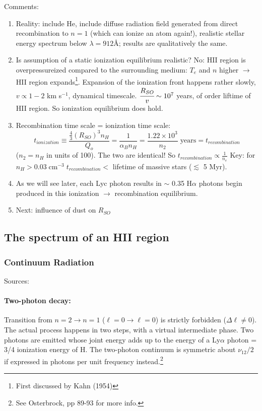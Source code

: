 \documentclass[12pt]{article}
\newcommand{\mar}[1]{\hspace{0pt}\marginpar{-\textcolor{black}{#1}-}}
\begin{document}
\mar{58}Comments:
\begin{enumerate}
    \item Reality: include He, include diffuse radiation field generated
        from direct recombination to $n=1$ (which can ionize an atom again!),
        realistic stellar energy spectrum below $\lambda = 912$\AA{};
        results are qualitatively the same.
    \item Is assumption of a static ionization equilibrium realistic? No: HII
        region is overpressureized compared to the surrounding medium: $T_{e}$ and
        $n$ higher $\longrightarrow$ HII region expands\footnote{First discussed
        by Kahn (1954)}. Expansion of the ionization front happens rather
        slowly, $v \propto 1-2$ km s$^{-1}$, dynamical timescale.
        $\cfrac{R_{SO}}{v} \sim 10^{7}$ years, of order liftime of HII region.
        So ionization equilibrium does hold.
    \item Recombination time scale = ionization time scale:$${
            t_{ionization} \equiv \frac{\frac{4}{3}(R_{SO})^{3}n_{H}}{Q_{o}} =
            \frac{1}{\alpha_{B}n_{H}} =
            \frac{1.22\times10^{3}}{n_{2}}\;\mathrm{years} =
            t_{recombination}
        }$$
        ($n_{2} = n_{H}$ in units of 100). The two are identical! So
        $t_{recombination} \propto \frac{1}{n_{e}}$
        Key: for $n_{H} > 0.03\;\mathrm{cm}^{-3}\;t_{recombination} <$
        lifetime of massive stars ($\lesssim$ 5 Myr).
    \item As we will see later, each Lyc photon results in $\sim$ 0.35
        H$\alpha$ photons begin produced in this ionization $\rightarrow$
        recombination equilibrium.
    \item Next: influence of dust on $R_{SO}$
\end{enumerate}

\subsection{The spectrum of an HII region}
\mar{63}
\subsubsection{Continuum Radiation}
Sources:
\paragraph{Two-photon decay:}
Transition from $n=2 \rightarrow n=1$ ($\ell=0 \rightarrow \ell=0$) is
strictly forbidden ($\Delta\ell \neq 0$).
The actual process happens in two steps, with a virtual intermediate
phase. Two photons are emitted whose joint energy adds up to the energy
of a Ly$\alpha$ photon = 3/4 ionization energy of H. The two-photon
continuum is symmetric about $\nu_{12}/2$ if expressed in photons
per unit frequency instead.\footnote{See Osterbrock, pp 89-93 for more info.}
\end{document}
